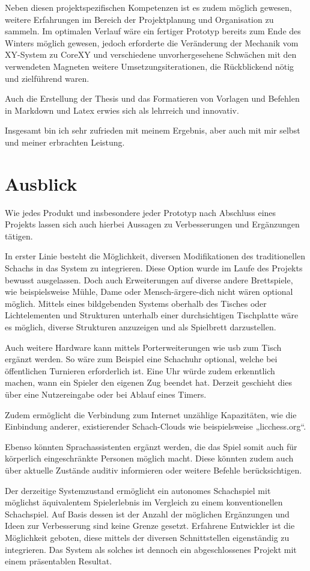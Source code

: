 Neben diesen projektspezifischen Kompetenzen ist es zudem möglich
gewesen, weitere Erfahrungen im Bereich der Projektplanung und
Organisation zu sammeln. Im optimalen Verlauf wäre ein fertiger Prototyp
bereits zum Ende des Winters möglich gewesen, jedoch erforderte die
Veränderung der Mechanik vom XY-System zu CoreXY und verschiedene
unvorhergesehene Schwächen mit den verwendeten Magneten weitere
Umsetzungsiterationen, die Rückblickend nötig und zielführend waren.

Auch die Erstellung der Thesis und das Formatieren von Vorlagen und
Befehlen in Markdown und Latex erwies sich als lehrreich und innovativ.

Insgesamt bin ich sehr zufrieden mit meinem Ergebnis, aber auch mit mir
selbst und meiner erbrachten Leistung.

\hypertarget{ausblick}{%
\section{Ausblick}\label{ausblick}}

Wie jedes Produkt und insbesondere jeder Prototyp nach Abschluss eines
Projekts lassen sich auch hierbei Aussagen zu Verbesserungen und
Ergänzungen tätigen.

In erster Linie besteht die Möglichkeit, diversen Modifikationen des
traditionellen Schachs in das System zu integrieren. Diese Option wurde
im Laufe des Projekts bewusst ausgelassen. Doch auch Erweiterungen auf
diverse andere Brettspiele, wie beispielsweise Mühle, Dame oder
Mensch-ärgere-dich nicht wären optional möglich. Mittels eines
bildgebenden Systems oberhalb des Tisches oder Lichtelementen und
Strukturen unterhalb einer durchsichtigen Tischplatte wäre es möglich,
diverse Strukturen anzuzeigen und als Spielbrett darzustellen.

Auch weitere Hardware kann mittels Porterweiterungen wie \gls{usb} zum
Tisch ergänzt werden. So wäre zum Beispiel eine Schachuhr optional,
welche bei öffentlichen Turnieren erforderlich ist. Eine Uhr würde zudem
erkenntlich machen, wann ein Spieler den eigenen Zug beendet hat.
Derzeit geschieht dies über eine Nutzereingabe oder bei Ablauf eines
Timers.

Zudem ermöglicht die Verbindung zum Internet unzählige Kapazitäten, wie
die Einbindung anderer, existierender Schach-Clouds wie beispielsweise
„licchess.org``.

Ebenso könnten Sprachassistenten ergänzt werden, die das Spiel somit
auch für körperlich eingeschränkte Personen möglich macht. Diese könnten
zudem auch über aktuelle Zustände auditiv informieren oder weitere
Befehle berücksichtigen.

Der derzeitige Systemzustand ermöglicht ein autonomes Schachspiel mit
möglichst äquivalentem Spielerlebnis im Vergleich zu einem
konventionellen Schachspiel. Auf Basis dessen ist der Anzahl der
möglichen Ergänzungen und Ideen zur Verbesserung sind keine Grenze
gesetzt. Erfahrene Entwickler ist die Möglichkeit geboten, diese mittels
der diversen Schnittstellen eigenständig zu integrieren. Das System als
solches ist dennoch ein abgeschlossenes Projekt mit einem präsentablen
Resultat.


